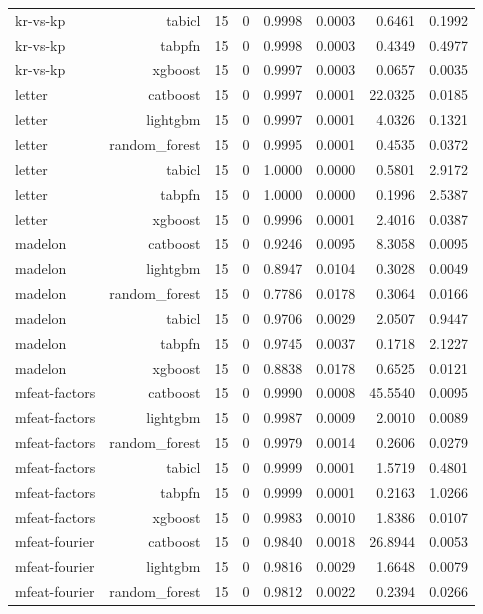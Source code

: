 \begin{table}[htbp]
\begin{tabular}{lrrrrrrr}
kr-vs-kp & tabicl & 15 & 0 & 0.9998 & 0.0003 & 0.6461 & 0.1992 \\
kr-vs-kp & tabpfn & 15 & 0 & 0.9998 & 0.0003 & 0.4349 & 0.4977 \\
kr-vs-kp & xgboost & 15 & 0 & 0.9997 & 0.0003 & 0.0657 & 0.0035 \\
letter & catboost & 15 & 0 & 0.9997 & 0.0001 & 22.0325 & 0.0185 \\
letter & lightgbm & 15 & 0 & 0.9997 & 0.0001 & 4.0326 & 0.1321 \\
letter & random\_forest & 15 & 0 & 0.9995 & 0.0001 & 0.4535 & 0.0372 \\
letter & tabicl & 15 & 0 & 1.0000 & 0.0000 & 0.5801 & 2.9172 \\
letter & tabpfn & 15 & 0 & 1.0000 & 0.0000 & 0.1996 & 2.5387 \\
letter & xgboost & 15 & 0 & 0.9996 & 0.0001 & 2.4016 & 0.0387 \\
madelon & catboost & 15 & 0 & 0.9246 & 0.0095 & 8.3058 & 0.0095 \\
madelon & lightgbm & 15 & 0 & 0.8947 & 0.0104 & 0.3028 & 0.0049 \\
madelon & random\_forest & 15 & 0 & 0.7786 & 0.0178 & 0.3064 & 0.0166 \\
madelon & tabicl & 15 & 0 & 0.9706 & 0.0029 & 2.0507 & 0.9447 \\
madelon & tabpfn & 15 & 0 & 0.9745 & 0.0037 & 0.1718 & 2.1227 \\
madelon & xgboost & 15 & 0 & 0.8838 & 0.0178 & 0.6525 & 0.0121 \\
mfeat-factors & catboost & 15 & 0 & 0.9990 & 0.0008 & 45.5540 & 0.0095 \\
mfeat-factors & lightgbm & 15 & 0 & 0.9987 & 0.0009 & 2.0010 & 0.0089 \\
mfeat-factors & random\_forest & 15 & 0 & 0.9979 & 0.0014 & 0.2606 & 0.0279 \\
mfeat-factors & tabicl & 15 & 0 & 0.9999 & 0.0001 & 1.5719 & 0.4801 \\
mfeat-factors & tabpfn & 15 & 0 & 0.9999 & 0.0001 & 0.2163 & 1.0266 \\
mfeat-factors & xgboost & 15 & 0 & 0.9983 & 0.0010 & 1.8386 & 0.0107 \\
mfeat-fourier & catboost & 15 & 0 & 0.9840 & 0.0018 & 26.8944 & 0.0053 \\
mfeat-fourier & lightgbm & 15 & 0 & 0.9816 & 0.0029 & 1.6648 & 0.0079 \\
mfeat-fourier & random\_forest & 15 & 0 & 0.9812 & 0.0022 & 0.2394 & 0.0266 \\

\end{tabular}
\end{table}
